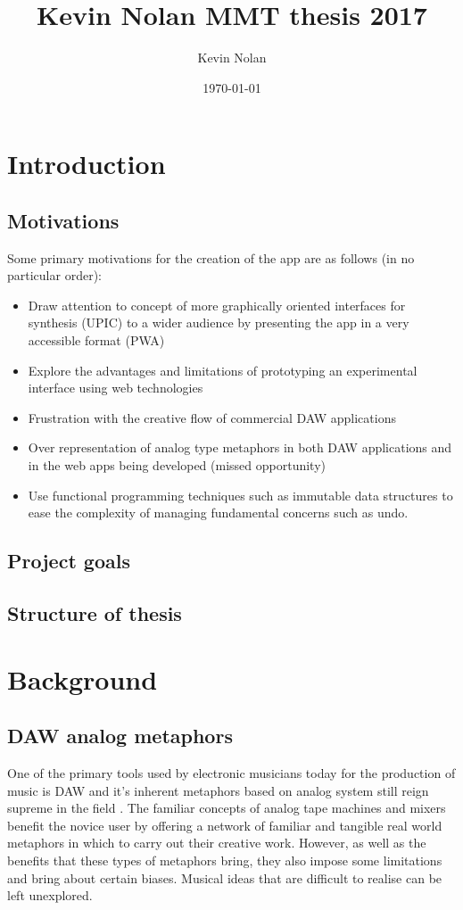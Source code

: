 \documentclass[a4paper,12pt]{article}
\author{Kevin Nolan}
\date{\today}
\title{Kevin Nolan MMT thesis 2017}
\begin{document}
\maketitle
\setcounter{tocdepth}{4}
\tableofcontents



\section{Introduction}
\label{sec:orgb12dd0d}
\subsection{Motivations}
\label{sec:orgdf66945}
Some primary motivations for the creation of the app are as follows (in no
particular order):
\begin{itemize}
\item Draw attention to concept of more graphically oriented interfaces for
synthesis (UPIC) to a wider audience by presenting the app in a very
accessible format (PWA)
\item Explore the advantages and limitations of prototyping an experimental
interface using web technologies
\item Frustration with the creative flow of commercial DAW applications
\item Over representation of analog type metaphors in both DAW applications and in
the web apps being developed (missed opportunity)
\item Use functional programming techniques such as immutable data structures to
ease the complexity of managing fundamental concerns such as undo.
\end{itemize}

\subsection{Project goals}
\label{sec:orgbacb5dd}
\subsection{Structure of thesis}
\label{sec:orgcd7f3c8}

\section{Background}
\label{sec:org68a1d09}

\subsection{DAW analog metaphors}
\label{sec:org1d99bb7}
One of the primary tools used by electronic musicians today for the production
of music is DAW and it's inherent metaphors based on analog system still reign
supreme in the field \cite{bell_journal_2015}. The familiar concepts of analog
tape machines and mixers benefit the novice user by offering a network of
familiar and tangible real world metaphors in which to carry out their creative
work. However, as well as the benefits that these types of metaphors bring, they
also impose some limitations and bring about certain biases. Musical ideas that
are difficult to realise can be left unexplored.
\end{document}
